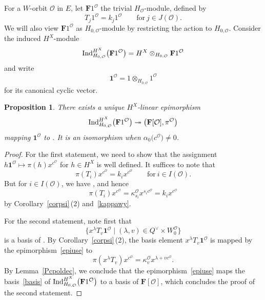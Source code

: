 \documentclass[11pt]{article}
\numberwithin{equation}{section}
\numberwithin{equation}{section}
\newtheorem{Proposition}[Theorem]{Proposition}
\begin{document}
For a $W$-orbit $\mathcal{O}$ in $E$, let $\mathbf{F}1^\mathcal{O}$
the trivial $H_\mathcal{O}$-module, defined by
\[
T_j1^\mathcal{O}=k_j1^\mathcal{O}\qquad \text{for}\ j\in J(\mathcal{O}).
\]
We will also view $\mathbf{F}1^\mathcal{O}$ as $H_{0,\mathcal{O}}$-module by restricting the action to $H_{0,\mathcal{O}}$.
Consider the induced $H^X$-module
\[
{\rm Ind}_{H_{0,\mathcal{O}}}^{H^X}\bigl(\mathbf{F}1^{\mathcal{O}}\bigr)=H^X\otimes_{H_{0,\mathcal{O}}}\mathbf{F}1^\mathcal{O}
\]
and write
\[
\mathbf{1}^{\mathcal{O}}=1\otimes_{H_{0,\mathcal{O}}}1^\mathcal{O}
\]
for its canonical cyclic vector.

\begin{Proposition}\label{indcor}
There exists a unique $H^X$-linear epimorphism
\begin{equation}\label{epiuse}
{\rm Ind}_{H_{0,\mathcal{O}}}^{H^X}\bigl(\mathbf{F}1^{\mathcal{O}}\bigr)\twoheadrightarrow
\bigl(\mathbf{F}[\mathcal{O}],\pi^\mathcal{O}\bigr)
\end{equation}
mapping $\mathbf{1}^{\mathcal{O}}$ to . It is an isomorphism when $\alpha_0\bigl(c^\mathcal{O}\bigr)\not=0$.
\end{Proposition}

\begin{proof}
For the first statement, we need to show that the assignment $h\mathbf{1}^{\mathcal{O}}\mapsto\pi(h)x^{c^\mathcal{O}}$ for $h\in H^X$ is well defined. It suffices to note that
\[
\pi(T_i)x^{c^\mathcal{O}}=k_ix^{c^\mathcal{O}}\qquad \text{for}\ i\in I(\mathcal{O}).
\]
But for $i\in I(\mathcal{O})$, we have , and hence
\[
\pi(T_i)x^{c^\mathcal{O}}=\kappa_{s_i}^\mathcal{O} x^{s_ic^\mathcal{O}}=k_ix^{c^\mathcal{O}}
\]
by Corollary~\ref{corpsi}\,(2) and~\eqref{kappawy}.

For the second statement, note first that
\begin{equation}\label{basis}
\bigl\{x^\lambda T_v\mathbf{1}^{\mathcal{O}}\mid (\lambda,v)\in Q^\vee\times W_0^\mathcal{O}\bigr\}
\end{equation}
is a basis of . By Corollary~\ref{corpsi}\,(2), the basis element $x^\lambda T_v\mathbf{1}^{\mathcal{O}}$
is mapped by the epimorphism~\eqref{epiuse} to
\[
\pi(x^\lambda T_v)x^{c^\mathcal{O}}=\kappa_v^\mathcal{O}x^{\lambda+vc^\mathcal{O}}.
\]
By Lemma~\ref{Pcpoldec}, we conclude that the epimorphism~\eqref{epiuse} maps the basis~\eqref{basis} of
${\rm Ind}_{H_{0,\mathcal{O}}}^{H^X}\bigl(\mathbf{F}1^\mathcal{O}\bigr)$
to a basis of $\mathbf{F}[\mathcal{O}]$, which concludes the proof of the second statement.
\end{proof}
\end{document}
